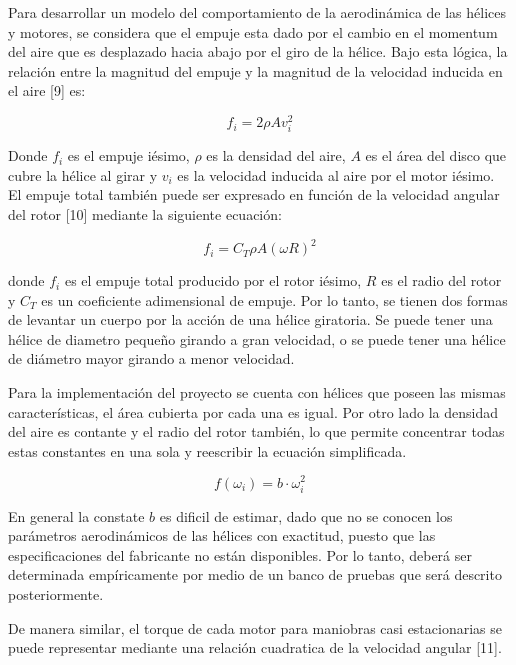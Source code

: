 \documentclass[\main/main.tex]{subfiles}
\begin{document}
Para desarrollar un modelo del comportamiento de la aerodinámica de
las hélices y motores, se considera que el empuje esta dado por el
cambio en el momentum del aire que es desplazado hacia abajo por el
giro de la hélice. Bajo esta lógica, la relación entre la magnitud
del empuje y la magnitud de la velocidad inducida en el aire [9] es: 

\begin{equation}
f_{i}=2\rho Av_{i}^{2}
\end{equation}

Donde $f_{i}$ es el empuje iésimo, $\rho$ es la densidad del aire,
$A$ es el área del disco que cubre la hélice al girar y $v_{i}$
es la velocidad inducida al aire por el motor iésimo. 
El empuje total también puede ser expresado en función de la velocidad
angular del rotor [10]  mediante la siguiente ecuación:

\begin{equation}
f_{i}=C_{T}\rho A(\omega R)^{2}
\end{equation}

donde $f_{i}$ es el empuje total producido por el rotor iésimo, $R$
es el radio del rotor y $C_{T}$ es un coeficiente adimensional de
empuje. Por lo tanto, se tienen dos formas de levantar un cuerpo por
la acción de una hélice giratoria. Se puede tener una hélice de diametro
pequeño girando a gran velocidad, o se puede tener una hélice de diámetro
mayor girando a menor velocidad.

Para la implementación del proyecto se cuenta con hélices que poseen
las mismas características, el área cubierta por cada una es igual.
Por otro lado la densidad del aire es contante y el radio del rotor
también, lo que permite concentrar todas estas constantes en una sola
y reescribir la ecuación simplificada.

\begin{equation}
f(\omega_{i})=b\cdot\omega_{i}^{2}
\end{equation}

En general la constate $b$ es dificil de estimar, dado que no se
conocen los parámetros aerodinámicos de las hélices con exactitud,
puesto que las especificaciones del fabricante no están disponibles.
Por lo tanto, deberá ser determinada empíricamente por medio de un
banco de pruebas que será descrito posteriormente.

De manera similar, el torque de cada motor para maniobras casi estacionarias
se puede representar mediante una relación cuadratica de la velocidad
angular [11].
\end{document}
